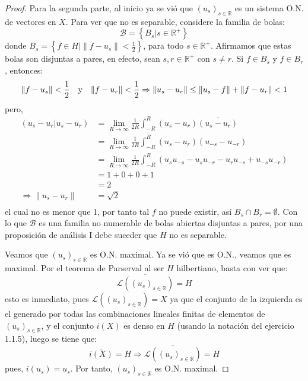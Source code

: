 \documentclass[12pt]{report}
\theoremstyle{largebreak}
\newcommand\pint[2]{\ensuremath{\left(#1\big|#2\right)}}
\newcommand\conj[1]{\ensuremath{\overline{#1}}}
\newcommand\norm[1]{\ensuremath{\|#1\|}}
\begin{document}
\begin{proof}
        Para la segunda parte, al inicio ya se vió que $\left(u_s \right)_{s\in\mathbb{R}}$ es un sistema O.N. de vectores en $X$. Para ver que no es separable, considere la familia de bolas:
        \begin{equation*}
            \mathcal{B}=\left\{B_s\Big|s\in\mathbb{R}^+ \right\}
        \end{equation*}
        donde $B_s=\left\{f\in H\Big|\norm{f-u_s}<\frac{1}{2} \right\}$, para todo $s\in\mathbb{R}^+$. Afirmamos que estas bolas son disjuntas a pares, en efecto, sean $s,r\in\mathbb{R}^+$ con $s\neq r$. Si $f\in B_s$ y $f\in B_r$, entonces:
        \begin{equation*}
            \norm{f-u_s}<\frac{1}{2} \quad\textup{y}\quad\norm{f-u_r}<\frac{1}{2}
            \Rightarrow  \norm{u_s-u_r}\leq\norm{u_s-f}+\norm{f-u_r}<1
        \end{equation*}
        pero,
        \begin{equation*}
            \begin{split}
                \pint{u_s-u_r}{u_s-u_r}&=\lim_{R\rightarrow\infty }\frac{1}{2R}\int_{-R}^{R}(u_s-u_r)\conj{(u_s-u_r)}\\
                &=\lim_{R\rightarrow\infty }\frac{1}{2R}\int_{-R}^{R}(u_s-u_r)(u_{-s}-u_{-r})\\
                &=\lim_{R\rightarrow\infty }\frac{1}{2R}\int_{-R}^{R}\left(u_s u_{-s} - u_s u_{-r} - u_r u_{-s} + u_{-s}u_{-r}\right) \\
                &=1+0+0+1\\
                &=2\\
                \Rightarrow \norm{u_s-u_r}&=\sqrt{2}\\
            \end{split}
        \end{equation*}
        el cual no es menor que 1, por tanto tal $f$ no puede existir, así $B_s\cap B_r=\emptyset$. Con lo que $\mathcal{B}$ es una familia no numerable de bolas abiertas disjuntas a pares, por una proposición de análisis I debe suceder que $H$ no es separable.

        Veamos que $\left(u_s \right)_{s\in\mathbb{R}}$ es O.N. maximal. Ya se vió que es O.N., veamos que es maximal. Por el teorema de Parserval al ser $H$ hilbertiano, basta con ver que:
        \begin{equation*}
            \overline{\mathcal{L}\left(\left(u_s \right)_{s\in\mathbb{R}}\right)}=H
        \end{equation*}
        esto es inmediato, pues $\mathcal{L}\left(\left(u_s \right)_{s\in\mathbb{R}}\right)=X$ ya que el conjunto de la izquierda es el generado por todas las combinaciones lineales finitas de elementos de $\left(u_s \right)_{s\in\mathbb{R}}$, y el conjunto $i(X)$ es denso en $H$ (usando la notación del ejercicio 1.1.5), luego se tiene que:
        \begin{equation*}
            \overline{i(X)}=H\Rightarrow\overline{\mathcal{L}\left(\left(u_s \right)_{s\in\mathbb{R}}\right)}=H
        \end{equation*}
        pues, $i(u_s)=u_s$. Por tanto, $\left(u_s \right)_{s\in\mathbb{R}}$ es O.N. maximal.
    \end{proof}
\end{document}
